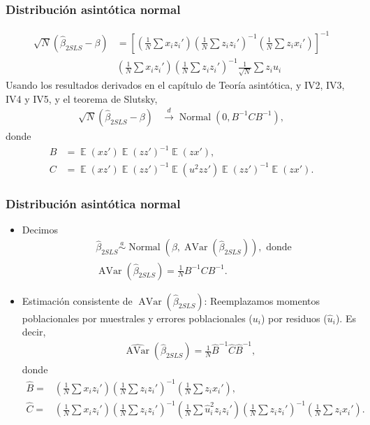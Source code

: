 \documentclass[t, compress, spanish, aspectratio=169]{beamer}
\DeclareMathOperator{\Avar}{AVar}
\DeclareMathOperator{\N}{Normal}
\DeclareMathOperator{\E}{\mathbb{E}}
\newcommand{\dto}{\stackrel{d}{\longrightarrow}}
\newcommand{\adistr}{\stackrel{a}{\sim}}
\begin{document}
\begin{frame}
    \frametitle{Distribuci\'on asint\'otica normal}
    \vspace*{-0.6em}
    \small
        \begin{align*}
            \sqrt{N} (\hat \beta_{2SLS} - \beta)&= \left[\left(\frac{1}{N}\sum x_i z_i'\right)\left(\frac{1}{N}\sum z_i z_i'\right)^{-1}\left(\frac{1}{N}\sum z_i x_i'\right) \right]^{-1}\\
                                    &
                                    \left(\frac{1}{N}\sum x_i z_i'\right)\left(\frac{1}{N}\sum z_i z_i'\right)^{-1}\frac{1}{\sqrt{N}} \sum z_i u_i
        \end{align*}
        Usando los resultados derivados en el cap\'itulo de Teor\'ia asint\'otica, y IV2, IV3, IV4 y IV5, y el  teorema de Slutsky,
        \begin{align*}
            \sqrt{N} (\hat \beta_{2SLS} - \beta)&\dto \N(0,B^{-1}CB^{-1}),
        \end{align*}
        donde 
        \begin{align*}
            B&=\E(xz')\E(zz')^{-1}\E(zx'),\\
            C&=\E(xz')\E(zz')^{-1}\E(u^2zz') \E(zz')^{-1}\E(zx').
        \end{align*}
\end{frame}
\begin{frame}
    \frametitle{Distribuci\'on asint\'otica normal}
    \vspace*{-0.6em}
    \small
    \begin{itemize}
        \item  Decimos
                \begin{align*}
                    &\hat \beta_{2SLS} \adistr \N(\beta,\Avar(\hat\beta_{2SLS})),\text{ donde}\\
                    &\Avar(\hat \beta_{2SLS})=\frac{1}{N}B^{-1}CB^{-1}.
                \end{align*}
         \item  Estimaci\'on consistente de $\Avar(\hat \beta_{2SLS})$: Reemplazamos momentos poblacionales por muestrales y errores poblacionales ($u_i$) por residuos ($\hat u_i$). Es decir,
                \begin{align*}
                    \widehat{\Avar}(\hat \beta_{2SLS})=\frac{1}{N}\hat B^{-1}\hat C \hat B^{-1},
                \end{align*}
                donde
                \scriptsize
                \begin{align*}
                    \hat B=&\left(\frac{1}{N}\sum x_i z_i'\right)\left(\frac{1}{N}\sum z_i z_i'\right)^{-1}\left(\frac{1}{N}\sum z_i x_i'\right),\\
                    \hat C=&\left(\frac{1}{N}\sum x_i z_i'\right)\left(\frac{1}{N}\sum z_i z_i'\right)^{-1}
                    \left(\frac{1}{N}\sum \hat u_i^2 z_i z_i'\right)
                    \left(\frac{1}{N}\sum z_i z_i'\right)^{-1}\left(\frac{1}{N}\sum z_i x_i'\right).
                \end{align*}
    \end{itemize}
\end{frame}
\end{document}
